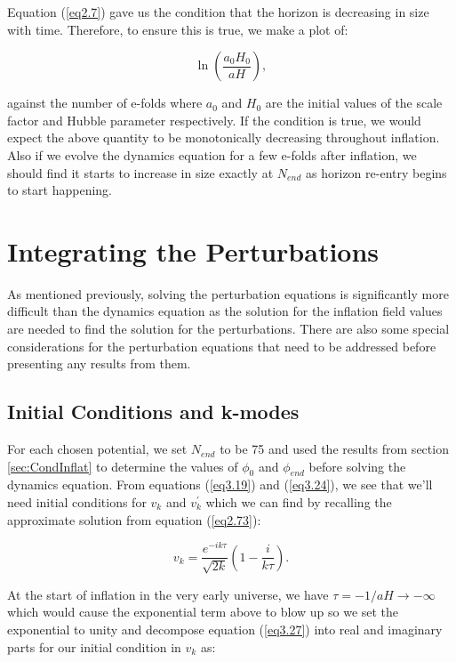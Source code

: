 \documentclass[a4paper,12pt,twoside]{report}
\begin{document}
Equation (\ref{eq2.7}) gave us the condition that the horizon is decreasing in size with time. Therefore, to ensure this is true, we make a plot of:

\begin{equation}
\ln \left( \frac{a_{0}H_{0}}{aH} \right),
\end{equation}

against the number of e-folds where $a_{0}$ and $H_{0}$ are the initial values of the scale factor and Hubble parameter respectively. If the condition is true, we would expect the above quantity to be monotonically decreasing throughout inflation. Also if we evolve the dynamics equation for a few e-folds after inflation, we should find it starts to increase in size exactly at $N_{end}$ as horizon re-entry begins to start happening.

\section{Integrating the Perturbations} \label{sec:IntegPerturbs}

As mentioned previously, solving the perturbation equations is significantly more difficult than the dynamics equation as the solution for the inflation field values are needed to find the solution for the perturbations. There are also some special considerations for the perturbation equations that need to be addressed before presenting any results from them.

\subsection{Initial Conditions and k-modes} \label{subsec:InitCondKmod}

For each chosen potential, we set $N_{end}$ to be 75 and used the results from section \ref{sec:CondInflat} to determine the values of $\phi_{0}$ and $\phi_{end}$ before solving the dynamics equation. From equations (\ref{eq3.19}) and (\ref{eq3.24}), we see that we'll need initial conditions for $v_{k}$ and $v_{k}^{\prime}$ which we can find by recalling the approximate solution from equation (\ref{eq2.73}):

\begin{equation} \label{eq3.27}
v_{k} = \frac{e^{-ik\tau}}{\sqrt{2k}} \left( 1 - \frac{i}{k \tau} \right).
\end{equation}

At the start of inflation in the very early universe, we have $\tau = -1/aH \rightarrow -\infty$ which would cause the exponential term above to blow up so we set the exponential to unity and decompose equation (\ref{eq3.27}) into real and imaginary parts for our initial condition in $v_{k}$ as:
\end{document}
